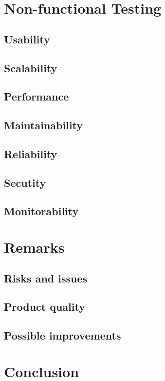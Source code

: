 \documentclass[a4paper,12pt,titlepage]{article}
\begin{document}
	
\section{Non-functional Testing}
	\subsection{Usability}
	
	
	\subsection{Scalability}
	
	
	\subsection{Performance}
	
	
	\subsection{Maintainability}
	
	
	\subsection{Reliability}
	
	
	\subsection{Secutity}
	
	
	\subsection{Monitorability}
	
	
\section{Remarks}
	\subsection{Risks and issues}
	
	
	\subsection{Product quality}
	 
	
	\subsection{Possible improvements}
	

\section{Conclusion}
	
\end{document}

